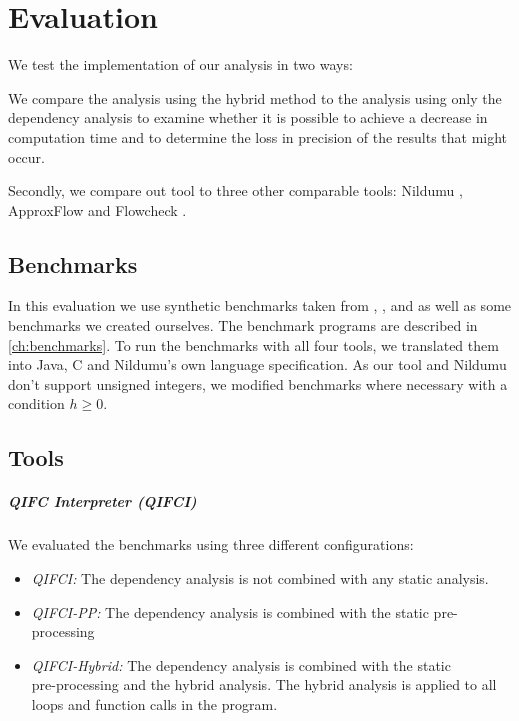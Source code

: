 \chapter{Evaluation}\label{sec:eval}
We test the implementation of our analysis in two ways:

We compare the analysis using the hybrid method to the analysis using only the dependency analysis to examine whether it is possible to achieve a decrease in computation time and to determine the loss in precision of the results that might occur.

Secondly, we compare out tool to three other comparable tools: Nildumu \cite{bechberger18}, ApproxFlow \cite{biondi18} and Flowcheck \cite{mccamant08}.

\section{Benchmarks}
In this evaluation we use synthetic benchmarks taken from \cite{backes09}, \cite{bechberger18}, \cite{biondi15} and \cite{meng11} as well as some benchmarks we created ourselves. The benchmark programs are described in \ref{ch:benchmarks}. To run the benchmarks with all four tools, we translated them into Java, C and Nildumu's own language specification. As our tool and Nildumu don't support unsigned integers, we modified benchmarks where necessary with a condition $h \geq 0$.

\section{Tools}

\paragraph{QIFC Interpreter (QIFCI)}
We evaluated the benchmarks using three different configurations:
\begin{itemize}
    \item \emph{QIFCI:} The dependency analysis is not combined with any static analysis.
    \item \emph{QIFCI-PP:} The dependency analysis is combined with the static pre-processing
    \item \emph{QIFCI-Hybrid:} The dependency analysis is combined with the static \\ pre-processing and the hybrid analysis. The hybrid analysis is applied to all loops and function calls in the program.
\end{itemize}

